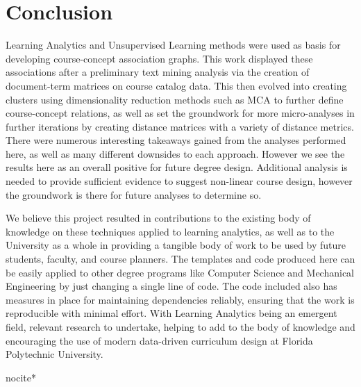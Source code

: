%
%
%

\chapter{Conclusion}

Learning Analytics and Unsupervised Learning methods were used as basis for developing course-concept association graphs. 
This work displayed these associations after a preliminary text mining analysis via the creation of document-term matrices 
on course catalog data.  This then evolved into creating clusters using dimensionality reduction methods such as MCA to 
further define course-concept relations, as well as set the groundwork for more  micro-analyses in further iterations by 
creating distance matrices with a variety of distance metrics.  There were numerous interesting takeaways gained from the 
analyses performed here, as well as many different downsides to each approach. However we see the results here as an 
overall positive for future degree design.  Additional analysis is needed to provide sufficient evidence to suggest 
non-linear course design,  however the groundwork is there for future analyses to determine so.

We believe this  project resulted in contributions to the existing body of knowledge on these techniques applied to 
learning analytics, as well as to the University as a whole in providing a tangible body of work to be used by future 
students, faculty, and course planners.   The templates and code produced here can be easily applied to other 
degree programs like Computer Science and Mechanical Engineering by just changing a single line of code. The code 
included also has measures in place for maintaining dependencies reliably,  ensuring that the work is reproducible 
with minimal effort. With Learning Analytics being an emergent field, relevant research to undertake, helping to add 
to the body of knowledge and encouraging the use of modern data-driven curriculum design at Florida Polytechnic University. 

nocite{*}






